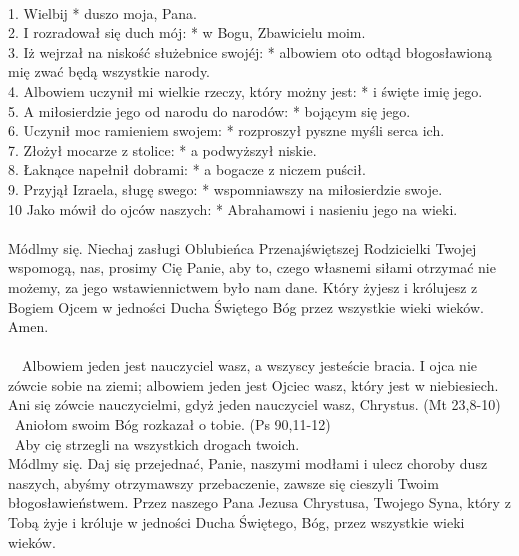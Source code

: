 \\
1. Wielbij * duszo moja, Pana.\\
2. I rozradował się duch mój: * w Bogu, Zbawicielu moim.\\
3. Iż wejrzał na niskość służebnice swojéj: * albowiem oto odtąd błogosławioną mię zwać będą wszystkie narody.\\
4. Albowiem uczynił mi wielkie rzeczy, który możny jest: * i święte imię jego.\\
5. A miłosierdzie jego od narodu do narodów: * bojącym się jego.\\
6. Uczynił moc ramieniem swojem: * rozproszył pyszne myśli serca ich.\\
7. Złożył mocarze z stolice: * a podwyższył niskie.\\
8. Łaknące napełnił dobrami: * a bogacze z niczem puścił.\\
9. Przyjął Izraela, sługę swego: * wspomniawszy na miłosierdzie swoje.\\
10 Jako mówił do ojców naszych: * Abrahamowi i nasieniu jego na wieki.\\
\\
Módlmy się. Niechaj zasługi Oblubieńca Przenajświętszej Rodzicielki Twojej wspomogą, nas, prosimy Cię Panie, aby to, czego własnemi siłami otrzymać nie możemy, za jego wstawiennictwem było nam dane. Który żyjesz i królujesz z Bogiem Ojcem w jedności Ducha Świętego Bóg przez wszystkie wieki wieków. Amen.\\
\\
~~Albowiem jeden jest nauczyciel wasz, a wszyscy jesteście bracia. I ojca nie zówcie sobie na ziemi; albowiem jeden jest Ojciec wasz, który jest w niebiesiech. Ani się zówcie nauczycielmi, gdyż jeden nauczyciel wasz, Chrystus. (Mt 23,8-10)\\
~Aniołom swoim Bóg rozkazał o tobie. (Ps 90,11-12)\\
~Aby cię strzegli na wszystkich drogach twoich. \\ 
Módlmy się. Daj się przejednać, Panie, naszymi modłami i ulecz choroby dusz naszych, abyśmy otrzymawszy przebaczenie, zawsze się cieszyli Twoim błogosławieństwem. Przez naszego Pana Jezusa Chrystusa, Twojego Syna, który z Tobą żyje i króluje w jedności Ducha Świętego, Bóg, przez wszystkie wieki wieków.
